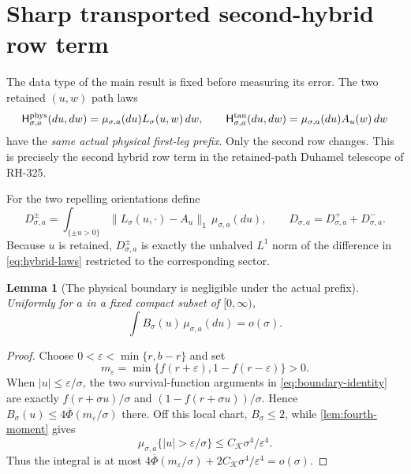 \documentclass[11pt]{article}
\newtheorem{lemma}[theorem]{Lemma}
\theoremstyle{definition}
\theoremstyle{remark}
\newcommand{\1}{\mathbf 1}
\begin{document}
\section{Sharp transported second-hybrid row term}

The data type of the main result is fixed before measuring its error.  The
two retained $(u,w)$ path laws
\begin{equation}\label{eq:hybrid-laws}
 \mathsf H^{\rm phys}_{\sigma,a}(du,dw)
 =\mu_{\sigma,a}(du)L_\sigma(u,w)\,dw,
 \qquad
 \mathsf H^{\rm tan}_{\sigma,a}(du,dw)
 =\mu_{\sigma,a}(du)A_u(w)\,dw
\end{equation}
have the \emph{same actual physical first-leg prefix}.  Only the second row
changes.  This is precisely the second hybrid row term in the retained-path
Duhamel telescope of RH-325.

For the two repelling orientations define
\begin{equation}\label{eq:D-sector}
 D^{\pm}_{\sigma,a}
 =\int_{\{\pm u>0\}}
 \|L_\sigma(u,\cdot)-A_u\|_1\,\mu_{\sigma,a}(du),
 \qquad
 D_{\sigma,a}=D^+_{\sigma,a}+D^-_{\sigma,a}.
\end{equation}
Because $u$ is retained, $D^{\pm}_{\sigma,a}$ is exactly the unhalved
$L^1$ norm of the difference in \eqref{eq:hybrid-laws} restricted to the
corresponding sector.

\begin{lemma}[The physical boundary is negligible under the actual prefix]
\label{lem:averaged-boundary}
Uniformly for $a$ in a fixed compact subset of $[0,\infty)$,
\begin{equation}\label{eq:averaged-boundary}
 \int B_\sigma(u)\,\mu_{\sigma,a}(du)=o(\sigma).
\end{equation}
\end{lemma}

\begin{proof}
Choose
$0<\varepsilon<\min\{r,b-r\}$ and set
\[
 m_\varepsilon
 =\min\{f(r+\varepsilon),1-f(r-\varepsilon)\}>0.
\]
When $|u|\le\varepsilon/\sigma$, the two survival-function arguments in
\eqref{eq:boundary-identity} are exactly
$f(r+\sigma u)/\sigma$ and $(1-f(r+\sigma u))/\sigma$.  Hence
$B_\sigma(u)\le4\overline\Phi(m_\varepsilon/\sigma)$ there.  Off this local
chart, $B_\sigma\le2$, while \cref{lem:fourth-moment} gives
\[
 \mu_{\sigma,a}\{|u|>\varepsilon/\sigma\}
 \le C_{\mathcal K}\sigma^4/\varepsilon^4.
\]
Thus the integral is at most
$4\overline\Phi(m_\varepsilon/\sigma)
 +2C_{\mathcal K}\sigma^4/\varepsilon^4=o(\sigma)$.
\end{proof}
\end{document}
